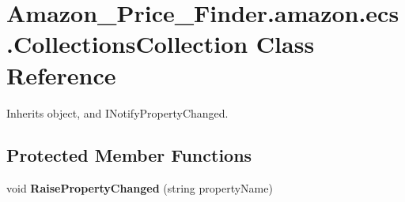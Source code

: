 \hypertarget{class_amazon___price___finder_1_1amazon_1_1ecs_1_1_collections_collection}{\section{Amazon\-\_\-\-Price\-\_\-\-Finder.\-amazon.\-ecs.\-Collections\-Collection Class Reference}
\label{class_amazon___price___finder_1_1amazon_1_1ecs_1_1_collections_collection}
}


 




Inherits object, and I\-Notify\-Property\-Changed.

\subsection*{Protected Member Functions}
\begin{DoxyCompactItemize}
\item 
\hypertarget{class_amazon___price___finder_1_1amazon_1_1ecs_1_1_collections_collection_ae2e7b48aba9556ff571a98943faef9bf}{void {\bfseries Raise\-Property\-Changed} (string property\-Name)}\label{class_amazon___price___finder_1_1amazon_1_1ecs_1_1_collections_collection_ae2e7b48aba9556ff571a98943faef9bf}

\end{DoxyCompactItemize}
